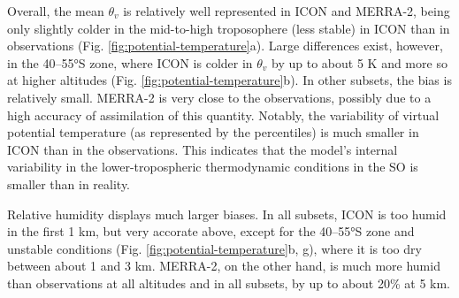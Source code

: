 \documentclass[12pt,a4paper]{article}
\begin{document}
Overall, the mean $\theta_v$ is relatively well represented in ICON and
MERRA-2, being only slightly colder in the mid-to-high troposophere (less
stable) in ICON than in observations (Fig. \ref{fig:potential-temperature}a).
Large differences exist, however, in the 40--55°S zone, where ICON is colder in
$\theta_v$ by up to about 5 K and more so at higher altitudes (Fig.
\ref{fig:potential-temperature}b). In other subsets, the bias is relatively
small. MERRA-2 is very close to the observations, possibly due to a high
accuracy of assimilation of this quantity. Notably, the variability of virtual
potential temperature (as represented by the percentiles) is much smaller in
ICON than in the observations. This indicates that the model's internal
variability in the lower-tropospheric thermodynamic conditions in the SO is
smaller than in reality.

Relative humidity displays much larger biases. In all subsets, ICON is too
humid in the first 1 km, but very accorate above, except for the 40--55°S zone
and unstable conditions (Fig. \ref{fig:potential-temperature}b, g),  where it
is too dry between about 1 and 3 km. MERRA-2, on the other hand, is much more
humid than observations at all altitudes and in all subsets, by up to about
20\% at 5 km.
\end{document}
